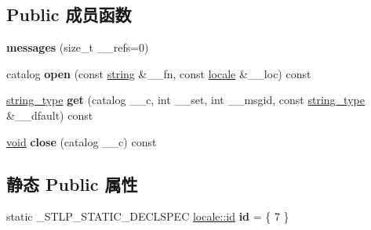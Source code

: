 \subsection*{Public 成员函数}
\begin{DoxyCompactItemize}
\item 
\mbox{\label{classmessages_3_01char_01_4_a8c898e69410d36c4c177f9a83d753668}} 
{\bfseries messages} (size\+\_\+t \+\_\+\+\_\+refs=0)
\item 
\mbox{\label{classmessages_3_01char_01_4_a8b3c767d21ded147d94ae4e692cbe5ac}} 
catalog {\bfseries open} (const \hyperlink{structstring}{string} \&\+\_\+\+\_\+fn, const \hyperlink{classlocale}{locale} \&\+\_\+\+\_\+loc) const
\item 
\mbox{\label{classmessages_3_01char_01_4_a434226ee88361bb91f41b63798e610a1}} 
\hyperlink{structstring}{string\+\_\+type} {\bfseries get} (catalog \+\_\+\+\_\+c, int \+\_\+\+\_\+set, int \+\_\+\+\_\+msgid, const \hyperlink{structstring}{string\+\_\+type} \&\+\_\+\+\_\+dfault) const
\item 
\mbox{\label{classmessages_3_01char_01_4_ac1e7ae263b08d2aa8d7b972221b894bf}} 
\hyperlink{interfacevoid}{void} {\bfseries close} (catalog \+\_\+\+\_\+c) const
\end{DoxyCompactItemize}
\subsection*{静态 Public 属性}
\begin{DoxyCompactItemize}
\item 
\mbox{\label{classmessages_3_01char_01_4_a2fc6ad31ea5029bc3c0bc143417f8c73}} 
static \+\_\+\+S\+T\+L\+P\+\_\+\+S\+T\+A\+T\+I\+C\+\_\+\+D\+E\+C\+L\+S\+P\+EC \hyperlink{classlocale_1_1id}{locale\+::id} {\bfseries id} = \{ 7 \}
\end{DoxyCompactItemize}
